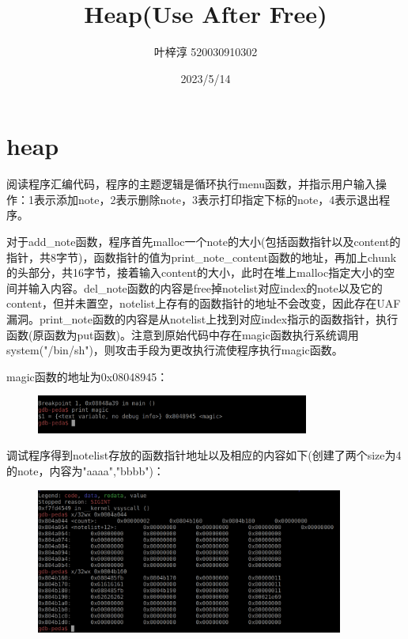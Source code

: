 \documentclass{article}
\date{2023/5/14}
\title{Heap(Use After Free)}
\author{叶梓淳 520030910302}
\begin{document}
\maketitle

\section{heap}
    阅读程序汇编代码，程序的主题逻辑是循环执行menu函数，并指示用户输入操作：1表示添加note，2表示删除note，3表示打印指定下标的note，4表示退出程序。
    
      
    对于add\_note函数，程序首先malloc一个note的大小(包括函数指针以及content的指针，共8字节)，函数指针的值为print\_note\_content函数的地址，再加上chunk的头部分，共16字节，接着输入content的大小，此时在堆上malloc指定大小的空间并输入内容。del\_note函数的内容是free掉notelist对应index的note以及它的content，但并未置空，notelist上存有的函数指针的地址不会改变，因此存在UAF漏洞。print\_note函数的内容是从notelist上找到对应index指示的函数指针，执行函数(原函数为put函数)。注意到原始代码中存在magic函数执行系统调用system("/bin/sh")，则攻击手段为更改执行流使程序执行magic函数。
    
    magic函数的地址为0x08048945：
    \begin{figure}[H]
    	\begin{center}
    		\includegraphics[width=0.8\textwidth]{1.png}
    	\end{center}
    \end{figure}
    
    调试程序得到notelist存放的函数指针地址以及相应的内容如下(创建了两个size为4的note，内容为"aaaa","bbbb")：
    \begin{figure}[H]
    	\begin{center}
    		\includegraphics[width=0.9\textwidth]{2.png}
    	\end{center}
    \end{figure}
    
\end{document}

